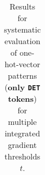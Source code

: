\begin{table}[t]
\begin{tabular}{lllllll}

\hline
\end{tabular}
\caption[Model Evaluation for only \texttt{DET} tokens]{Results for systematic evaluation of one-hot-vector patterns (\textbf{only \texttt{DET} tokens}) for multiple integrated gradient thresholds $t$.}
\label{tab:evalResultsDET}
\end{table}
	
